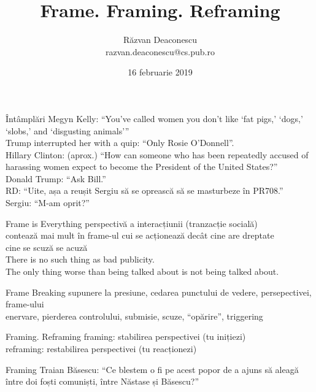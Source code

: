 \documentclass{simple}
\title[Frame. Framing. Reframing]{Frame. Framing. Reframing}
\institute{Excursie PR708 \& friends}
\author[Răzvan Deaconescu]{Răzvan Deaconescu \\
razvan.deaconescu@cs.pub.ro}
\date{16 februarie 2019}
\begin{document}
\frame{\titlepage}

\begin{frame}{Întâmplări}
  \pause
  Megyn Kelly: ``You’ve called women you don’t like ‘fat pigs,’ ‘dogs,’ ‘slobs,’ and ‘disgusting animals’'' \\
  \pause
  Trump interrupted her with a quip: ``Only Rosie O’Donnell''. \\
  \vspace{0.5cm}
  \pause
  Hillary Clinton: (aprox.) ``How can someone who has been repeatedly accused of harassing women expect to become the President of the United States?'' \\
  \pause
  Donald Trump: ``Ask Bill.'' \\
  \vspace{0.5cm}
  \pause
  RD: ``Uite, așa a reușit Sergiu să se oprească să se masturbeze în PR708.'' \\
  \pause
  Sergiu: ``M-am oprit?''
\end{frame}

\begin{frame}{Frame is Everything}
  \pause perspectivă a interacțiunii (tranzacție socială) \\
  \pause contează mai mult în frame-ul cui se acționează decât cine are dreptate \\
  \pause cine se scuză se acuză \\
  \pause There is no such thing as bad publicity. \\
  \pause The only thing worse than being talked about is not being talked about.
\end{frame}

\begin{frame}{Frame Breaking}
  \pause
  supunere la presiune, cedarea punctului de vedere, persepectivei, frame-ului \\
  \pause
  enervare, pierderea controlului, submisie, scuze, ``opărire'', triggering
\end{frame}

\begin{frame}{Framing. Reframing}
  \pause
  framing: stabilirea perspectivei (tu inițiezi) \\
  \pause
  reframing: restabilirea perspectivei (tu reacționezi) \\
\end{frame}

\begin{frame}{Framing}
  Traian Băsescu: ``Ce blestem o fi pe acest popor de a ajuns să aleagă între doi foști comuniști, între Năstase și Băsescu?''
\end{frame}
\end{document}
